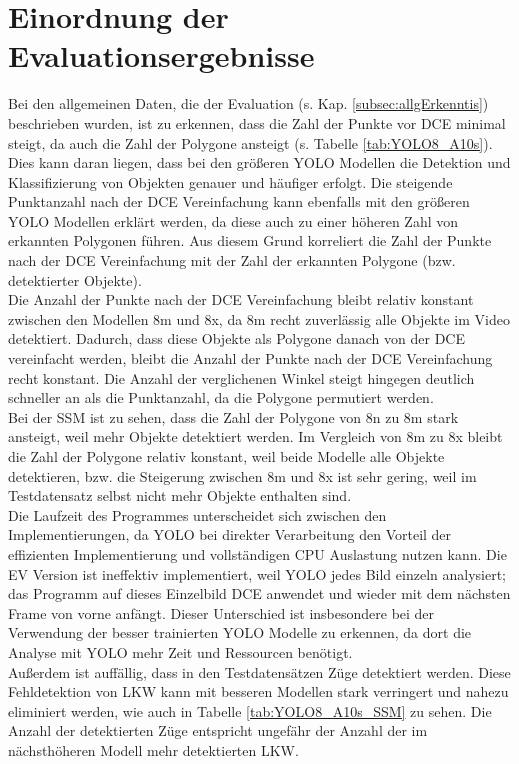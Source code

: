 {	\section{Einordnung der Evaluationsergebnisse}
	{
		Bei den allgemeinen Daten, die der Evaluation (s. Kap. \ref{subsec:allgErkenntis}) beschrieben wurden, ist zu erkennen, dass die Zahl der Punkte vor DCE minimal steigt, da auch die Zahl der Polygone ansteigt (s. Tabelle \ref{tab:YOLO8_A10s}). Dies kann daran liegen, dass bei den größeren YOLO Modellen die Detektion und Klassifizierung von Objekten genauer und häufiger erfolgt. Die steigende Punktanzahl nach der DCE Vereinfachung kann ebenfalls mit den größeren YOLO Modellen erklärt werden, da diese auch zu einer höheren Zahl von erkannten Polygonen führen. Aus diesem Grund korreliert die Zahl der Punkte nach der DCE Vereinfachung mit der Zahl der erkannten Polygone (bzw. detektierter Objekte).\\
		Die Anzahl der Punkte nach der DCE Vereinfachung bleibt relativ konstant zwischen den Modellen 8m und 8x, da 8m recht zuverlässig alle Objekte im Video detektiert. Dadurch, dass diese Objekte als Polygone danach von der DCE vereinfacht werden, bleibt die Anzahl der Punkte nach der DCE Vereinfachung recht konstant. Die Anzahl der verglichenen Winkel steigt hingegen deutlich schneller an als die Punktanzahl, da die Polygone permutiert werden. \\
		Bei der SSM ist zu sehen, dass die Zahl der Polygone von 8n zu 8m stark ansteigt, weil mehr Objekte detektiert werden. Im Vergleich von 8m zu 8x bleibt die Zahl der Polygone relativ  konstant, weil beide Modelle alle Objekte detektieren, bzw. die Steigerung zwischen 8m und 8x ist sehr gering, weil im Testdatensatz selbst nicht mehr Objekte enthalten sind. \\
		Die Laufzeit des Programmes unterscheidet sich zwischen den Implementierungen, da YOLO bei direkter Verarbeitung den Vorteil der effizienten Implementierung und vollständigen CPU Auslastung nutzen kann. Die EV Version ist ineffektiv implementiert, weil YOLO jedes Bild einzeln analysiert; das Programm auf dieses Einzelbild DCE anwendet und wieder mit dem nächsten Frame von vorne anfängt. Dieser Unterschied ist insbesondere bei der Verwendung der besser trainierten YOLO Modelle zu erkennen, da dort die Analyse mit YOLO mehr Zeit und Ressourcen benötigt. \\
		Außerdem ist auffällig, dass in den Testdatensätzen Züge detektiert werden. Diese Fehldetektion von LKW kann mit besseren Modellen stark verringert und nahezu eliminiert werden, wie auch in Tabelle \ref{tab:YOLO8_A10s_SSM} zu sehen. Die Anzahl der detektierten Züge entspricht ungefähr der Anzahl der im nächsthöheren Modell mehr detektierten LKW. \\

}}
